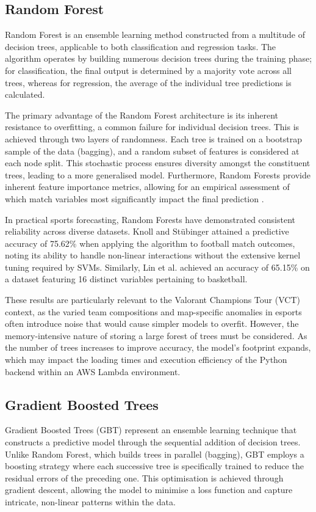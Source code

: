 \subsection*{Random Forest}
Random Forest is an ensemble learning method constructed from a multitude of decision trees, applicable to both classification and regression tasks. The algorithm operates by building numerous decision trees during the training phase; for classification, the final output is determined by a majority vote across all trees, whereas for regression, the average of the individual tree predictions is calculated.

The primary advantage of the Random Forest architecture is its inherent resistance to overfitting, a common failure for individual decision trees. This is achieved through two layers of randomness. Each tree is trained on a bootstrap sample of the data (bagging), and a random subset of features is considered at each node split. This stochastic process ensures diversity amongst the constituent trees, leading to a more generalised model. Furthermore, Random Forests provide inherent feature importance metrics, allowing for an empirical assessment of which match variables most significantly impact the final prediction \cite{osisanwo2017supervised}.

In practical sports forecasting, Random Forests have demonstrated consistent reliability across diverse datasets. Knoll and St{\"u}binger \cite{knoll2020machine} attained a predictive accuracy of 75.62\% when applying the algorithm to football match outcomes, noting its ability to handle non-linear interactions without the extensive kernel tuning required by SVMs. Similarly, Lin et al. \cite{lin2014predicting} achieved an accuracy of 65.15\% on a dataset featuring 16 distinct variables pertaining to basketball.

These results are particularly relevant to the Valorant Champions Tour (VCT) context, as the varied team compositions and map-specific anomalies in esports often introduce noise that would cause simpler models to overfit. However, the memory-intensive nature of storing a large forest of trees must be considered. As the number of trees increases to improve accuracy, the model's footprint expands, which may impact the loading times and execution efficiency of the Python backend within an AWS Lambda environment.

\subsection*{Gradient Boosted Trees}
Gradient Boosted Trees (GBT) represent an ensemble learning technique that constructs a predictive model through the sequential addition of decision trees. Unlike Random Forest, which builds trees in parallel (bagging), GBT employs a boosting strategy where each successive tree is specifically trained to reduce the residual errors of the preceding one. This optimisation is achieved through gradient descent, allowing the model to minimise a loss function and capture intricate, non-linear patterns within the data.

